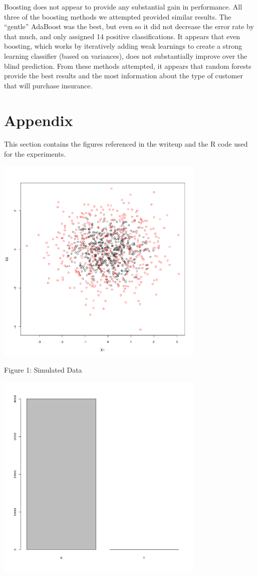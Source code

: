 \documentclass[a4paper,10pt]{article}
\begin{document}
Boosting does not appear to provide any substantial gain in performance. All three of the boosting
methods we attempted provided similar results. The ``gentle'' AdaBoost was the best, but even so
it did not decrease the error rate by that much, and only assigned 14 positive classifications. It
appears that even boosting, which works by iteratively adding weak learnings to create a strong learning
classifier (based on variances), does not substantially improve over the blind prediction. From
these methods attempted, it appears that random forests provide the best results and the most information
about the type of customer that will purchase insurance.

\section{Appendix}

This section contains the figures referenced in the writeup and the R code used for the experiments.


\includegraphics[width=100mm]{simulated_classes.png}

Figure 1: Simulated Data

\includegraphics[width=100mm]{vs_blind.png}
\end{document}
